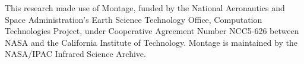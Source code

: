 \documentclass[10pt,preprint]{aastex}
\begin{document}
This research made use of Montage, funded by the National Aeronautics and
Space Administration's Earth Science Technology Office, Computation
Technologies Project, under Cooperative Agreement Number NCC5-626 between
NASA and the California Institute of Technology. Montage is maintained by
the NASA/IPAC Infrared Science Archive.




\newpage


\newpage

\end{document}

